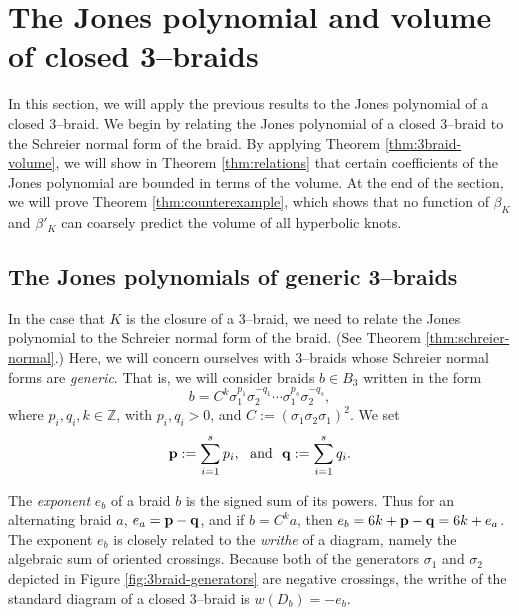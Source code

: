 \documentclass[11pt]{amsart}
\newcommand{\ZZ}{{\mathbb{Z}}}
\theoremstyle{plain}
\theoremstyle{definition}
\begin{document}
\section{The Jones polynomial  and volume of closed
	3--braids}\label{sec:jones3braids}



In this section, we will apply the previous results to the Jones
polynomial of a closed 3--braid.  We begin by relating the Jones
polynomial of a closed $3$--braid to the Schreier normal form of the
braid.  By applying Theorem \ref{thm:3braid-volume}, we will show in
Theorem \ref{thm:relations} that certain coefficients of the Jones
polynomial are bounded in terms of the volume.  At the end of the
section, we will prove Theorem \ref{thm:counterexample}, which shows
that no function of $\beta_K$ and $\beta'_K$ can coarsely
predict the volume of all hyperbolic knots.

\subsection{The Jones polynomials of generic 3--braids}\label{subsec:generic-jones}

In the case that $K$ is the closure of a 3--braid, we need to relate
the Jones polynomial to the Schreier normal form of the braid. (See
Theorem \ref{thm:schreier-normal}.)  Here, we will concern ourselves
with 3--braids whose Schreier normal forms are \emph{generic}.  That
is, we will consider braids $b\in B_3$ written in the form
$$b= C^k \sigma_1^{p_1} \sigma_2^{-q_1} \cdots \sigma_1^{p_s}
\sigma_2^{-q_s},$$
%
where $p_i, q_i, k \in \ZZ$, with $p_i, q_i>0$, and $C:=(\sigma_1
\sigma_2 \sigma_1 )^2$.  We set
$${\bf p}:=\sum_{i=1}^s p_i, \ \ {\rm and} \ \ {\bf q}:=\sum_{i=1}^s
q_i.$$
%

The \emph{exponent} $e_b$ of a braid $b$ is the signed sum of its
powers.  Thus for an alternating braid $a$, $e_a = {\bf p} - {\bf q}$,
and if $b=C^k a$, then $e_b = 6k + {\bf p} - {\bf q} = 6k + e_a$.  The
exponent $e_b$ is closely related to the \emph{writhe} of a diagram,
namely the algebraic sum of oriented crossings. Because both of the
generators $\sigma_1$ and $\sigma_2$ depicted in Figure
\ref{fig:3braid-generators} are negative crossings, the writhe of the
standard diagram of a closed 3--braid is $w(D_b) = - e_b$.
\end{document}
